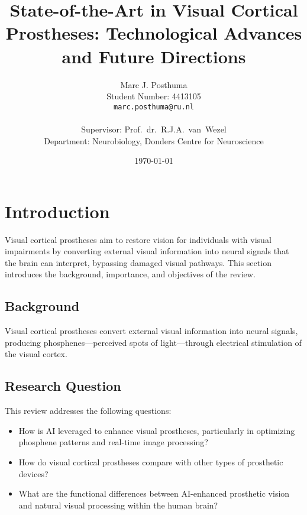 \documentclass[twocolumn,10pt]{article}
\title{State-of-the-Art in Visual Cortical Prostheses: Technological Advances and Future Directions}
\author{
  Marc J. Posthuma\\
  Student Number: 4413105\\
  \texttt{marc.posthuma@ru.nl}\\
  \\
  Supervisor: Prof.\ dr.\ R.J.A.\ van\ Wezel\\
  Department: Neurobiology, Donders Centre for Neuroscience
}
\date{\today}
\begin{document}

\section{Introduction}\label{sec:intro}
Visual cortical prostheses aim to restore vision for individuals with visual impairments by converting external visual information into neural signals that the brain can interpret, bypassing damaged visual pathways. This section introduces the background, importance, and objectives of the review.

\subsection{Background}
Visual cortical prostheses convert external visual information into neural signals, producing phosphenes—perceived spots of light—through electrical stimulation of the visual cortex.

\subsection{Research Question}
This review addresses the following questions:
\begin{itemize}
    \item How is AI leveraged to enhance visual prostheses, particularly in optimizing phosphene patterns and real-time image processing?
    \item How do visual cortical prostheses compare with other types of prosthetic devices?
    \item What are the functional differences between AI-enhanced prosthetic vision and natural visual processing within the human brain?
\end{itemize}
\end{document}
